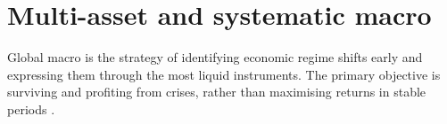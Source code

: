 \chapter{Multi-asset and systematic macro}\label{legacy:multi-asset-systematic-macro}

Global macro is the strategy of identifying economic regime shifts early and expressing them through the most liquid instruments. The primary objective is surviving and profiting from crises, rather than maximising returns in stable periods \citep{s7-gliner}.



\newpage


\newpage

